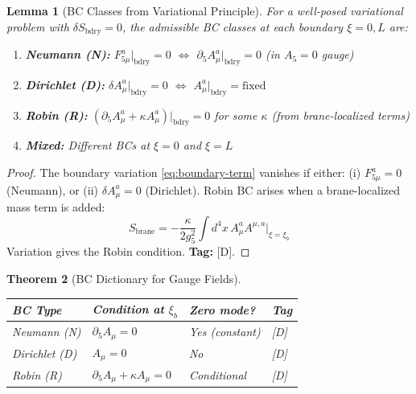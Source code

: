 \documentclass[11pt,a4paper]{article}
\newtheorem{theorem}{Theorem}[section]
\newtheorem{lemma}[theorem]{Lemma}
\begin{document}
\begin{lemma}[BC Classes from Variational Principle]
\label{lem:bc-classes}
For a well-posed variational problem with $\delta S_{\text{bdry}} = 0$, the
admissible BC classes at each boundary $\xi = 0, L$ are:
\begin{enumerate}
  \item \textbf{Neumann (N):} $F_{5\mu}^a|_{\text{bdry}} = 0$
        $\Leftrightarrow$ $\partial_5 A_\mu^a|_{\text{bdry}} = 0$
        (in $A_5 = 0$ gauge)
  \item \textbf{Dirichlet (D):} $\delta A_\mu^a|_{\text{bdry}} = 0$
        $\Leftrightarrow$ $A_\mu^a|_{\text{bdry}} = \text{fixed}$
  \item \textbf{Robin (R):} $(\partial_5 A_\mu^a + \kappa A_\mu^a)|_{\text{bdry}} = 0$
        for some $\kappa$ (from brane-localized terms)
  \item \textbf{Mixed:} Different BCs at $\xi = 0$ and $\xi = L$
\end{enumerate}
\end{lemma}

\begin{proof}
The boundary variation \eqref{eq:boundary-term} vanishes if either:
(i) $F_{5\mu}^a = 0$ (Neumann), or (ii) $\delta A_\mu^a = 0$ (Dirichlet).
Robin BC arises when a brane-localized mass term is added:
\begin{equation}
  S_{\text{brane}} = -\frac{\kappa}{2g_5^2} \int d^4x \, A_\mu^a A^{\mu,a} \big|_{\xi=\xi_b}
  \label{eq:brane-mass-gauge}
\end{equation}
Variation gives the Robin condition. \textbf{Tag:} [D].
\end{proof}

\begin{theorem}[BC Dictionary for Gauge Fields]
\label{thm:bc-dict}
\begin{center}
\begin{tabular}{llll}
\toprule
BC Type & Condition at $\xi_b$ & Zero mode? & Tag \\
\midrule
Neumann (N) & $\partial_5 A_\mu = 0$ & Yes (constant) & [D] \\
Dirichlet (D) & $A_\mu = 0$ & No & [D] \\
Robin (R) & $\partial_5 A_\mu + \kappa A_\mu = 0$ & Conditional & [D] \\
\bottomrule
\end{tabular}
\end{center}
\end{theorem}
\end{document}

